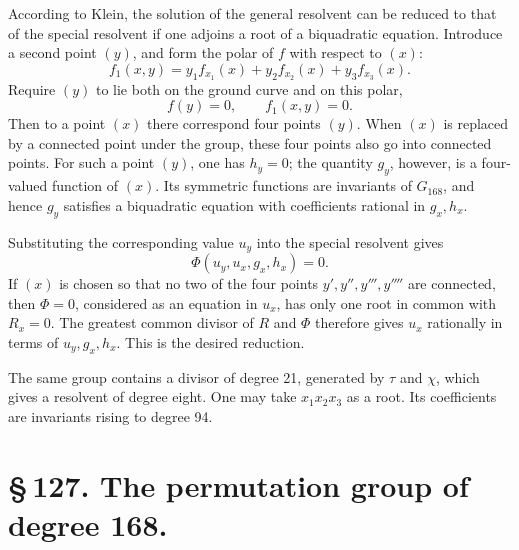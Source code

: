 \documentclass[11pt]{article}
\begin{document}
According to Klein, the solution of the general resolvent can be reduced to that of the special resolvent if one adjoins a root of a biquadratic equation. Introduce a second point \((y)\), and form the polar of \(f\) with respect to \((x)\):
\begin{equation}
f_1(x,y)=y_1f_{x_1}(x)+y_2f_{x_2}(x)+y_3f_{x_3}(x).
\tag{3}
\end{equation}
Require \((y)\) to lie both on the ground curve and on this polar,
\begin{equation}
f(y)=0,
\qquad
f_1(x,y)=0.
\tag{4}
\end{equation}
Then to a point \((x)\) there correspond four points \((y)\). When \((x)\) is replaced by a connected point under the group, these four points also go into connected points. For such a point \((y)\), one has \(h_y=0\); the quantity \(g_y\), however, is a four-valued function of \((x)\). Its symmetric functions are invariants of \(G_{168}\), and hence \(g_y\) satisfies a biquadratic equation with coefficients rational in \(g_x,h_x\).

Substituting the corresponding value \(u_y\) into the special resolvent gives
\begin{equation}
\Phi(u_y,u_x,g_x,h_x)=0.
\tag{5}
\end{equation}
If \((x)\) is chosen so that no two of the four points \(y',y'',y''',y''''\) are connected, then \(\Phi=0\), considered as an equation in \(u_x\), has only one root in common with \(R_x=0\). The greatest common divisor of \(R\) and \(\Phi\) therefore gives \(u_x\) rationally in terms of \(u_y,g_x,h_x\). This is the desired reduction.

The same group contains a divisor of degree 21, generated by \(\tau\) and \(\chi\), which gives a resolvent of degree eight. One may take \(x_1x_2x_3\) as a root. Its coefficients are invariants rising to degree 94.

\section*{\S\,127. The permutation group of degree 168.}
\end{document}
